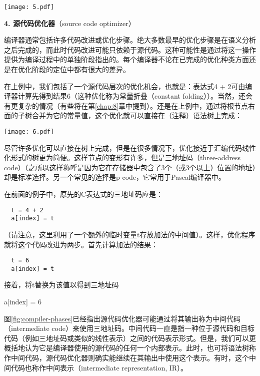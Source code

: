 \documentclass[lang=cn,10pt]{elegantbook}
\begin{document}
\begin{center}
  \texttt{[image: 5.pdf]}
\end{center}

\textbf{4. 源代码优化器}（source code optimizer）

编译器通常包括许多代码改进或优化步骤。绝大多数最早的优化步骤是在语义分析之后完成的，而此时代码改进可能只依赖于源代码。这种可能性是通过将这一操作提供为编译过程中的单独阶段指出的。每个编译器不论在已完成的优化种类方面还是在优化阶段的定位中都有很大的差异。

在上例中，我们包括了一个源代码层次的优化机会，也就是：表达式4 + 2可由编译器计算先得到结果6（这种优化称为常量折叠（constant folding））。当然，还会有更复杂的情况（有些将在第\ref{chap:8}章中提到）。还是在上例中，通过将根节点右面的子树合并为它的常量值，这个优化就可以直接在（注释）语法树上完成：

\begin{center}
  \texttt{[image: 6.pdf]}
\end{center}

尽管许多优化可以直接在树上完成，但是在很多情况下，优化接近于汇编代码线性化形式的树更为简便。这样节点的变形有许多，但是三地址码（three-address code）（之所以这样称呼是因为它在存储器中包含了3个（或3个以上）位置的地址）却是标准选择。另一个常见的选择是p-code，它常用于Pascal编译器中。

在前面的例子中，原先的C表达式的三地址码应是：

\begin{lstlisting}
  t = 4 + 2
  a[index] = t
\end{lstlisting}

（请注意，这里利用了一个额外的临时变量t存放加法的中间值）。这样，优化程序就将这个代码改进为两步。首先计算加法的结果：

\begin{lstlisting}
  t = 6
  a[index] = t
\end{lstlisting}

接着，将t替换为该值以得到三地址码

a[index] = 6

图\ref{fig:compiler-phases}已经指出源代码优化器可能通过将其输出称为中间代码（intermediate code）来使用三地址码。中间代码一直是指一种位于源代码和目标代码（例如三地址码或类似的线性表示）之间的代码表示形式。但是，我们可以更概括地认为它是编译器使用的源代码的任何一个内部表示。此时，也可将语法树称作中间代码，源代码优化器则确实能继续在其输出中使用这个表示。有时，这个中间代码也称作中间表示（intermediate representation, IR）。
\end{document}

